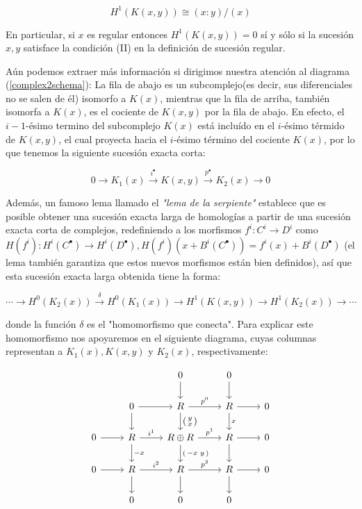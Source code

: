 $$H^1(K(x,y))\cong(x:y)/(x)$$

En particular, si $x$ es regular entonces $H^1(K(x,y)) = 0$ sí y sólo si la sucesión $x, y$ satisface la condición (II) en la definición de sucesión regular.

Aún podemos extraer más información si dirigimos nuestra atención al diagrama (\ref{complex2schema}): La fila de abajo es un subcomplejo(es decir, sus diferenciales no se salen de él) isomorfo a $K(x)$, mientras que la fila de arriba, también isomorfa a $K(x)$, es el cociente de $K(x, y)$ por la fila de abajo. En efecto, el $i-1$-ésimo termino del subcomplejo $K(x)$ está incluído en el $i$-ésimo térmido de $K(x, y)$, el cual proyecta hacia el $i$-ésimo término del cociente $K(x)$, por lo que tenemos la siguiente sucesión exacta corta:

$$ 0 \rightarrow K_1(x) \xrightarrow{i^\bullet} K(x,y) \xrightarrow{p^\bullet} K_2(x) \rightarrow 0 $$

Además, un famoso lema llamado el \emph{"lema de la serpiente"} establece que es posible obtener una sucesión exacta larga de homologías a partir de una sucesión exacta corta de complejos, redefiniendo a los morfismos $f^i:C^i\rightarrow D^i$ como $H(f^i):H^i(C^{\bullet})\rightarrow H^i(D^{\bullet}), H(f^i)(x + B^i(C^\bullet)) = f^i(x) + B^i(D^\bullet)$ (el lema también garantiza que estos nuevos morfismos están bien definidos), así que esta sucesión exacta larga obtenida tiene la forma:

$$\cdots \rightarrow H^0(K_2(x)) \xrightarrow{\delta} H^0(K_1(x)) \rightarrow H^1(K(x, y)) \rightarrow H^1(K_2(x)) \rightarrow \cdots$$

donde la función $\delta$ es el "homomorfismo que conecta". Para explicar este homomorfismo nos apoyaremos en el siguiente diagrama, cuyas columnas representan a $K_1(x), K(x, y)$ y $K_2(x)$, respectivamente:

\[
\begin{tikzcd}[ampersand replacement=\&]
\&\& 0 \ar{d} \& 0 \ar{d} \\
\&0 \ar{r} \ar{d} \& R \ar{r}{p^0} \ar{d}{
\left( \begin{smallmatrix} y \\ x \end{smallmatrix} \right)
} \& R \ar{d}{x} \ar{r} \& 0 \\
0 \ar{r} \&R \ar{r}{i^1} \ar{d}{-x} \& R \oplus R \ar{r}{p^1} \ar{d}{
\left( \begin{smallmatrix} -x & y \end{smallmatrix} \right)
} \& R \ar{d} \ar{r} \& 0 \\
0 \ar{r} \&R \ar{r}{i^2} \ar{d} \& R \ar{r}{p^2} \ar{d} \& R \ar{r} \ar{d} \& 0 \\
\& 0 \& 0 \& 0 
\end{tikzcd}
\]

